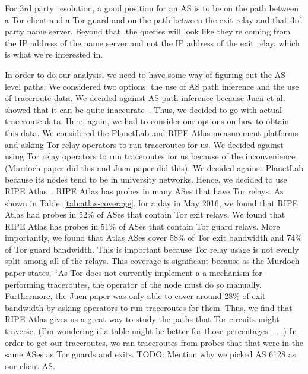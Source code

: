 For 3rd party resolution, a good position for an AS is to be on the path between 
a Tor client and a Tor guard and on the path between the exit relay and that 3rd party 
name server. Beyond that, the queries will look like they're coming from the IP address 
of the name server and not the IP address of the exit relay, which is what we're interested 
in.

In order to do our analysis, we need to have some way of figuring out the AS-level paths. 
We considered two options: the use of AS path inference and the use of traceroute data. 
We decided against AS path inference because Juen et al. showed that it can be quite
inaccurate~\cite{Juen2015a}.  Thus, we decided to go with actual traceroute data. Here,
again, we had to consider our options on how to obtain this data. We considered the
PlanetLab and RIPE Atlas measurement platforms and asking Tor relay operators to run
traceroutes for us.  We decided against using Tor relay operators to run traceroutes for
us because of the inconvenience (Murdoch paper did this and Juen paper did this). We
decided against PlanetLab because its nodes tend to be in university networks. Hence, we
decided to use RIPE Atlas~\cite{atlas}. RIPE Atlas has probes in many ASes that have Tor
relays. As shown in Table~\ref{tab:atlas-coverage}, for a day in May 2016, we found that
RIPE Atlas had probes in 52\% of ASes that contain Tor exit relays.  We found that RIPE
Atlas has probes in 51\% of ASes that contain Tor guard relays. More importantly, we found
that Atlas ASes cover 58\% of Tor exit bandwidth and 74\% of Tor guard bandwidth. This is
important because Tor relay usage is not evenly split among all of the relays. This
coverage is significant because as the Murdoch paper states, ``As Tor does not currently
implement a a mechanism for performing traceroutes, the operator of the node must do so
manually. Furthermore, the Juen paper was only able to cover around 28\% of exit bandwidth
by asking operators to run traceroutes for them.  Thus, we find that RIPE Atlas gives us a
great way to study the paths that Tor circuits might traverse. (I'm wondering if a table
might be better for those percentages .  . .) In order to get our traceroutes, we ran
traceroutes from probes that that were in the same ASes as Tor guards and exits. TODO:
Mention why we picked AS 6128 as our client AS.



